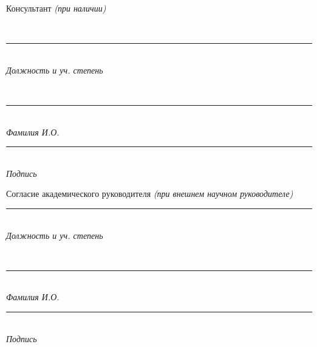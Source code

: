 \documentclass[12pt,a4paper]{article}
\newcommand{\hseSignField}[2]{%
  \begin{minipage}[t]{#1}\centering
    \rule{\linewidth}{0.4pt}\\[-2pt]{\footnotesize\itshape #2}
  \end{minipage}}
\newcommand{\hseFilledField}[3]{%
  \begin{minipage}[t]{#1}\centering
    {\small\strut #2}\\[-4pt]\rule{\linewidth}{0.4pt}\\[-2pt]{\footnotesize\itshape #3}
  \end{minipage}}
\begin{document}
\ifhseHasCoSupervisor
\vspace{0.5cm}
\begin{minipage}[t]{0.27\textwidth}\raggedright Консультант {\itshape(при наличии)}\end{minipage}%
\hseFilledField{0.3\textwidth}{\hseCoSupervisorTitle\ifdefempty{\hseCoSupervisorDegree}{}{, \hseCoSupervisorDegree}}{Должность и уч. степень}\hfill
\hseFilledField{0.22\textwidth}{\hseCoSupervisorShortName}{Фамилия И.О.}\hfill
\hseSignField{0.15\textwidth}{Подпись}
\fi

\ifhseExternalSupervisor
\vspace{0.5cm}
\begin{minipage}[t]{0.27\textwidth}\raggedright Согласие академического руководителя {\itshape(при внешнем научном руководителе)}\end{minipage}%
\hseSignField{0.3\textwidth}{Должность и уч. степень}\hfill
\hseFilledField{0.22\textwidth}{\hseAcademicSupervisorShortName}{Фамилия И.О.}\hfill
\hseSignField{0.15\textwidth}{Подпись}
\fi

\vfill
\begin{center}\hseCityYear\end{center}
\fi
\end{document}
